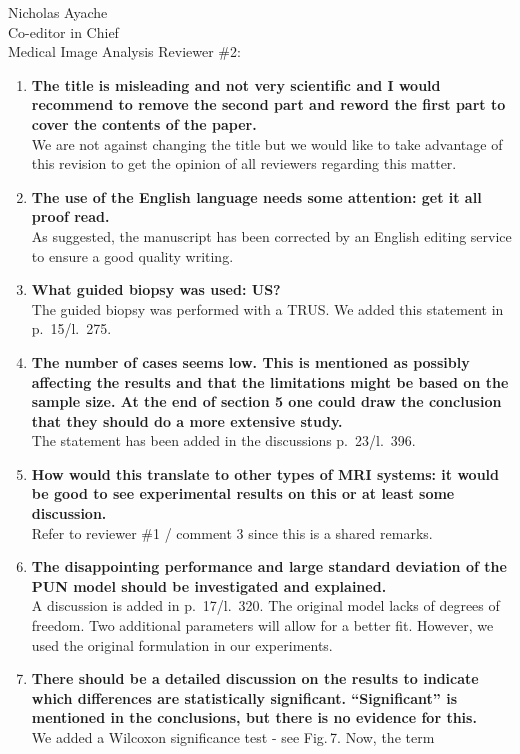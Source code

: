 \documentclass{letter}
\begin{document}
\begin{letter}{Nicholas Ayache \\ Co-editor in Chief \\ Medical Image Analysis}
  Reviewer \#2:
  \begin{enumerate}
  \item \textbf{The title is misleading and not very scientific and I
      would recommend to remove the second part and reword the first
      part to cover the contents of the paper.}\\
    We are not against changing the title but we would like to take
    advantage of this revision to get the opinion of all reviewers
    regarding this matter.
  \item \textbf{The use of the English language needs some attention:
      get it all proof read.}\\
    As suggested, the manuscript has been corrected by an English editing
    service to ensure a good quality writing.
  \item \textbf{What guided biopsy was used: US?}\\
    The guided biopsy was performed with a TRUS. We added this
    statement in p.~15/l.~275.
  \item \textbf{The number of cases seems low. This is mentioned as
      possibly affecting the results and that the limitations might be
      based on the sample size. At the end of section 5 one could draw
      the conclusion that they should do a more extensive study.}\\
    The statement has been added in the discussions p.~23/l.~396.
  \item \textbf{How would this translate to other types of MRI
      systems: it would be good to see experimental results on this or
      at least some discussion.}\\
    Refer to reviewer \#1 / comment 3 since this is a shared remarks.
  \item \textbf{The disappointing performance and large standard
      deviation of the PUN model should be investigated and
      explained.}\\
    A discussion is added in p.~17/l.~320. The original model lacks of
    degrees of freedom. Two additional parameters will
    allow for a better fit. However, we used the original formulation
    in our experiments.
  \item \textbf{There should be a detailed discussion on the results
      to indicate which differences are statistically
      significant. ``Significant'' is mentioned in the conclusions, but
      there is no evidence for this.}\\
    We added a Wilcoxon significance test - see Fig.\,7. Now, the term

\end{enumerate}
\end{letter}
\end{document}
